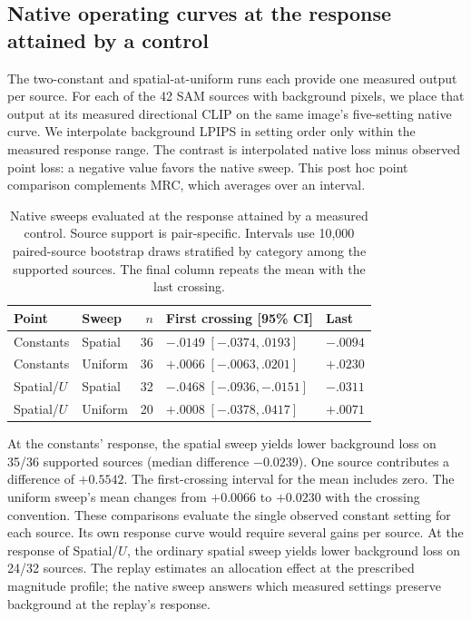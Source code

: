 \subsection{Native operating curves at the response attained by a control}
\label{sec:v21-points}
The two-constant and spatial-at-uniform runs each provide one measured output per source. For each of the 42 SAM sources with background pixels, we place that output at its measured directional CLIP on the same image's five-setting native curve. We interpolate background LPIPS in setting order only within the measured response range. The contrast is interpolated native loss minus observed point loss: a negative value favors the native sweep. This post hoc point comparison complements MRC, which averages over an interval.

\begin{table}[t]\centering\footnotesize
\caption{Native sweeps evaluated at the response attained by a measured control. Source support is pair-specific. Intervals use 10,000 paired-source bootstrap draws stratified by category among the supported sources. The final column repeats the mean with the last crossing.}
\label{tab:v21-points}
\setlength{\tabcolsep}{2pt}
\begin{tabular}{@{}llrll@{}}\toprule
Point & Sweep & $n$ & First crossing [95\% CI] & Last\\\midrule
Constants & Spatial & 36 & $-.0149\;[-.0374,.0193]$ & $-.0094$\\
Constants & Uniform & 36 & $+.0066\;[-.0063,.0201]$ & $+.0230$\\
Spatial/$U$ & Spatial & 32 & $-.0468\;[-.0936,-.0151]$ & $-.0311$\\
Spatial/$U$ & Uniform & 20 & $+.0008\;[-.0378,.0417]$ & $+.0071$\\\bottomrule
\end{tabular}
\end{table}

At the constants' response, the spatial sweep yields lower background loss on 35/36 supported sources (median difference $-0.0239$). One source contributes a difference of $+0.5542$. The first-crossing interval for the mean includes zero. The uniform sweep's mean changes from $+0.0066$ to $+0.0230$ with the crossing convention. These comparisons evaluate the single observed constant setting for each source. Its own response curve would require several gains per source. At the response of Spatial/$U$, the ordinary spatial sweep yields lower background loss on 24/32 sources. The replay estimates an allocation effect at the prescribed magnitude profile; the native sweep answers which measured settings preserve background at the replay's response.

